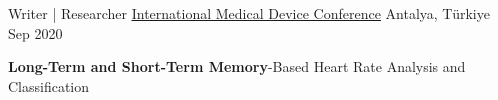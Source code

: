\begin{cventries}
  \cventry
    {Writer | Researcher} %
{\underline{\href{https://drive.google.com/file/d/1ZHOTCGskb33IGZGYQ3Ekqhd1twpte5GM/view?usp=sharing}{International Medical Device Conference}}} %
    {Antalya, Türkiye} %
    {Sep 2020} %
    {
      \begin{cvitems} %
        \item {\textbf{Long-Term and Short-Term Memory}-Based Heart Rate Analysis and Classification }
      \end{cvitems}
    }

\end{cventries}
